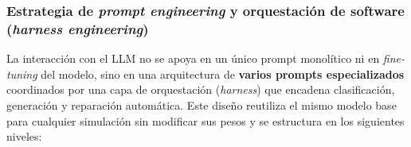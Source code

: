 
\subsubsection{Estrategia de \textit{prompt engineering} y orquestación de software (\textit{harness engineering})}
\label{sec:prompt_eng}
La interacción con el LLM no se apoya en un único prompt monolítico ni en
\textit{fine-tuning} del modelo, sino en una arquitectura de \textbf{varios
prompts especializados} coordinados por una capa de orquestación
(\textit{harness}) que encadena clasificación, generación y reparación
automática. Este diseño reutiliza el mismo modelo base para cualquier simulación
sin modificar sus pesos y se estructura en los siguientes niveles:

